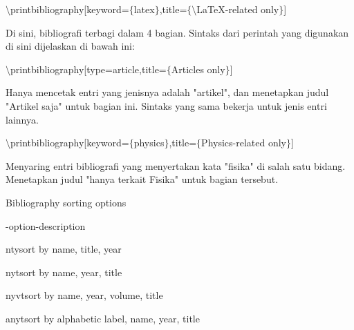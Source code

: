 \begin{itemize}
$\setminus$printbibliography[keyword=$ \{ $latex$ \} $,title=$ \{ $$\setminus$LaTeX-related only$ \} $]\par
\vspace{\baselineskip}
Di sini, bibliografi terbagi dalam 4 bagian. Sintaks dari perintah yang digunakan di sini dijelaskan di bawah ini:\par

$\setminus$printbibliography[type=article,title=$ \{ $Articles only$ \} $]\par
\vspace{\baselineskip}
Hanya mencetak entri yang jenisnya adalah "artikel", dan menetapkan judul "Artikel saja" untuk bagian ini. Sintaks yang sama bekerja untuk jenis entri lainnya.\par

$\setminus$printbibliography[keyword=$ \{ $physics$ \} $,title=$ \{ $Physics-related only$ \} $]\par

Menyaring entri bibliografi yang menyertakan kata "fisika" di salah satu bidang. Menetapkan judul "hanya terkait Fisika" untuk bagian tersebut.\par
\vspace{12pt}
Bibliography sorting options\par

-option\hspace*{0.5in}\hspace*{0.5in}\hspace*{0.5in}-description\par

nty\hspace*{0.5in}\hspace*{0.5in}\hspace*{0.5in}sort by name, title, year\par

nyt\hspace*{0.5in}\hspace*{0.5in}\hspace*{0.5in}sort by name, year, title\par

nyvt\hspace*{0.5in}\hspace*{0.5in}\hspace*{0.5in}sort by name, year, volume, title\par

anyt\hspace*{0.5in}\hspace*{0.5in}\hspace*{0.5in}sort by alphabetic label, name, year, title\par


\end{itemize}
